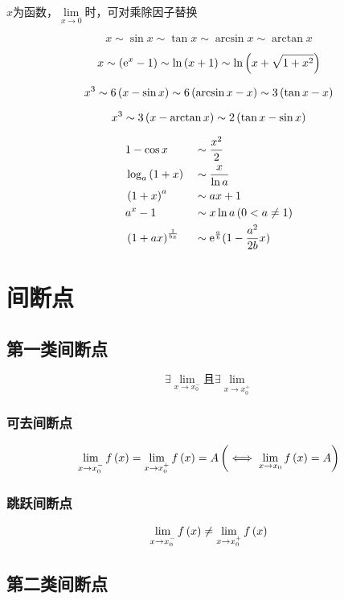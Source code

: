 \documentclass{article}
\begin{document}
$x$为函数，$\lim\limits_{x\to0}$时，可对乘除因子替换

\[x\sim\sin x\sim\tan x\sim\arcsin x\sim\arctan x\]

\[x\sim\left(\mathrm e^x-1\right)\sim\ln\left(x+1\right)\sim\ln\left(x+\sqrt{1+x^2}\right)\]

\[x^3\sim6\left(x-\sin x\right)\sim6\left(\arcsin x-x\right)\sim3\left(\tan x-x\right)\]

\[x^3\sim3\left(x-\arctan x\right)\sim2\left(\tan x -\sin x\right)\]

\[\begin{aligned}
         & 1-\cos x            &  & \sim\frac{x^2}2                    \\
         & \log_a{\left(1+x\right)}     &  & \sim\frac x{\ln a}                 \\
         & \left(1+x\right)^a           &  & \sim ax+1                          \\
         & a^x-1               &  & \sim x\ln a\left(0<a\neq1\right)            \\
         & \left(1+ax\right)^\frac1{bx} &  & \sim\mathrm e^\frac ab(1-\frac{a^2}{2b}x) \\
    \end{aligned}\]

\section{间断点}

\subsection{第一类间断点}

\[\exists\lim_{x\to x_0^-}\text{且}\exists\lim_{x\to x_0^+}\]

\subsubsection{可去间断点}

\[\lim_{x\to x_0^-}f\left(x\right)=\lim_{x\to x_0^+}f\left(x\right)=A\left(\iff\lim_{x\to x_0}f\left(x\right)=A\right)\]

\subsubsection{跳跃间断点}

\[\lim_{x\to x_0^-}f\left(x\right)\neq\lim_{x\to x_0^+}f\left(x\right)\]

\subsection{第二类间断点}
\end{document}
